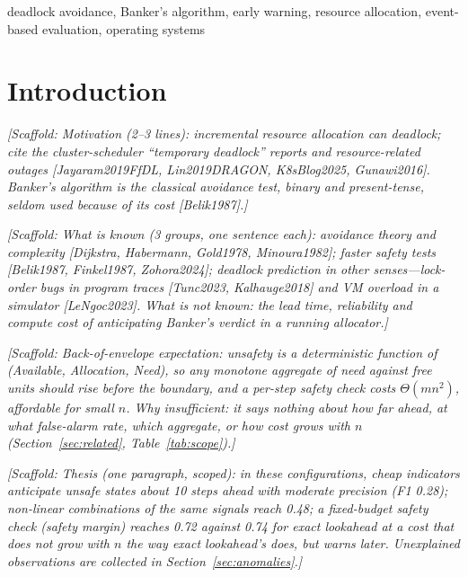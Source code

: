 \documentclass[conference]{IEEEtran}
\newcommand{\scaffold}[1]{\textcolor{blue!60!black}{\textit{[Scaffold: #1]}}}
\begin{document}
\begin{IEEEkeywords}
deadlock avoidance, Banker's algorithm, early warning, resource allocation, event-based evaluation, operating systems
\end{IEEEkeywords}

\section{Introduction}\label{sec:intro}

\scaffold{Motivation (2--3 lines): incremental resource allocation can deadlock; cite the cluster-scheduler ``temporary deadlock'' reports and resource-related outages [Jayaram2019FfDL, Lin2019DRAGON, K8sBlog2025, Gunawi2016]. Banker's algorithm is the classical avoidance test, binary and present-tense, seldom used because of its cost [Belik1987].}

\scaffold{What is known (3 groups, one sentence each): avoidance theory and complexity [Dijkstra, Habermann, Gold1978, Minoura1982]; faster safety tests [Belik1987, Finkel1987, Zohora2024]; deadlock prediction in other senses---lock-order bugs in program traces [Tunc2023, Kalhauge2018] and VM overload in a simulator [LeNgoc2023]. What is not known: the lead time, reliability and compute cost of anticipating Banker's verdict in a running allocator.}

\scaffold{Back-of-envelope expectation: unsafety is a deterministic function of (Available, Allocation, Need), so any monotone aggregate of need against free units should rise before the boundary, and a per-step safety check costs $\Theta(mn^2)$, affordable for small $n$. Why insufficient: it says nothing about how far ahead, at what false-alarm rate, which aggregate, or how cost grows with $n$ (Section~\ref{sec:related}, Table~\ref{tab:scope}).}

\scaffold{Thesis (one paragraph, scoped): in these configurations, cheap indicators anticipate unsafe states about 10 steps ahead with moderate precision (F1 0.28); non-linear combinations of the same signals reach 0.48; a fixed-budget safety check (safety margin) reaches 0.72 against 0.74 for exact lookahead at a cost that does not grow with $n$ the way exact lookahead's does, but warns later. Unexplained observations are collected in Section~\ref{sec:anomalies}.}
\end{document}
